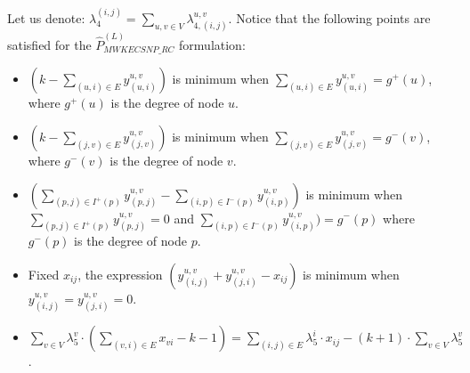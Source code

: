 Let us denote: $\lambda^{(i,j)}_{4}=\sum_{u,v\in V}
\lambda^{u,v}_{4,(i,j)}$. Notice that the following points are
satisfied for the $\hat{P}^{(L)}_{MWKECSNP\_RC}$ formulation:
\begin{itemize}
    \item $\left(k-\sum_{(u,i)\in E} y_{(u,i)}^{u,v}\right)$ is
    minimum when $\sum_{(u,i)\in E} y_{(u,i)}^{u,v}=g^{+}(u)$,
    where $g^{+}(u)$ is the degree of node $u$.
    \item $\left(k-\sum_{(j,v)\in E} y_{(j,v)}^{u,v}\right)$ is
    minimum when $\sum_{(j,v)\in E} y_{(j,v)}^{u,v}=g^{-}(v)$,
    where $g^{-}(v)$ is the degree of node $v$.
    \item $(\sum_{(p,j)\in I^{+}(p)} y_{(p,j)}^{u,v}-\sum_{(i,p)\in I^{-}(p)}
    y_{(i,p)}^{u,v})$ is minimum when $\sum_{(p,j)\in I^{+}(p)}
    y_{(p,j)}^{u,v}=0$ and $\sum_{(i,p)\in I^{-}(p)}
    y_{(i,p)}^{u,v})=g^{-}(p)$ where $g^{-}(p)$ is the degree of node
    $p$.
    \item Fixed $x_{ij}$, the expression $(y_{(i,j)}^{u,v}+y_{(j,i)}^{u,v}-x_{ij})$ is minimum
    when $y_{(i,j)}^{u,v}=y_{(j,i)}^{u,v}=0$.
    \item $\sum_{v\in V} \lambda^{v}_{5}\cdot \left(\sum_{(v,i)\in E}
    x_{vi}-k-1\right)=\sum_{(i,j)\in E} \lambda^{i}_{5}\cdot x_{ij}-(k+1)\cdot \sum_{v\in V}
    \lambda^{v}_{5}$.
\end{itemize}


